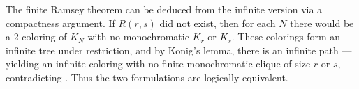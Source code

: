 \begin{remark} \label{remark:infinite_ramsey_implies_finite_ramsey_via_compactness}
The finite Ramsey theorem can be deduced from the infinite version via a compactness argument. If $R(r,s)$ did not exist, then for each $N$ there would be a 2-coloring of $K_N$ with no monochromatic $K_r$ or $K_s$. These colorings form an infinite tree under restriction, and by Konig's lemma, there is an infinite path — yielding an infinite coloring with no finite monochromatic clique of size $r$ or $s$, contradicting . Thus the two formulations are logically equivalent.
\end{remark}
